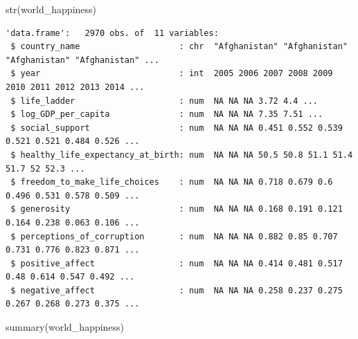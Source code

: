 \documentclass[
  letterpaper,
  DIV=11,
  numbers=noendperiod]{scrreprt}
\newenvironment{Shaded}{\begin{snugshade}}{\end{snugshade}}
\newcommand{\FunctionTok}[1]{\textcolor[rgb]{0.28,0.35,0.67}{#1}}
\newcommand{\NormalTok}[1]{\textcolor[rgb]{0.00,0.23,0.31}{#1}}
\begin{document}
\begin{Shaded}
\begin{Highlighting}[]
\FunctionTok{str}\NormalTok{(world\_happiness)}
\end{Highlighting}
\end{Shaded}

\begin{verbatim}
'data.frame':   2970 obs. of  11 variables:
 $ country_name                    : chr  "Afghanistan" "Afghanistan" "Afghanistan" "Afghanistan" ...
 $ year                            : int  2005 2006 2007 2008 2009 2010 2011 2012 2013 2014 ...
 $ life_ladder                     : num  NA NA NA 3.72 4.4 ...
 $ log_GDP_per_capita              : num  NA NA NA 7.35 7.51 ...
 $ social_support                  : num  NA NA NA 0.451 0.552 0.539 0.521 0.521 0.484 0.526 ...
 $ healthy_life_expectancy_at_birth: num  NA NA NA 50.5 50.8 51.1 51.4 51.7 52 52.3 ...
 $ freedom_to_make_life_choices    : num  NA NA NA 0.718 0.679 0.6 0.496 0.531 0.578 0.509 ...
 $ generosity                      : num  NA NA NA 0.168 0.191 0.121 0.164 0.238 0.063 0.106 ...
 $ perceptions_of_corruption       : num  NA NA NA 0.882 0.85 0.707 0.731 0.776 0.823 0.871 ...
 $ positive_affect                 : num  NA NA NA 0.414 0.481 0.517 0.48 0.614 0.547 0.492 ...
 $ negative_affect                 : num  NA NA NA 0.258 0.237 0.275 0.267 0.268 0.273 0.375 ...
\end{verbatim}

\begin{Shaded}
\begin{Highlighting}[]
\FunctionTok{summary}\NormalTok{(world\_happiness)}
\end{Highlighting}
\end{Shaded}
\end{document}
